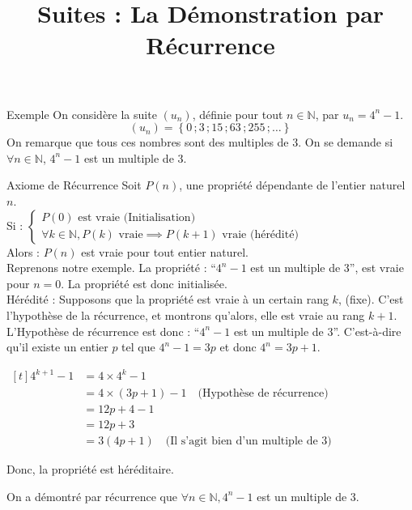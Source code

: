 \documentclass{cours}
\title{Suites : La Démonstration par Récurrence}
\begin{document}

    \begin{Gpartie}{Exemple}
        On considère la suite $\left(u_n\right)$, définie pour tout $n\in\mathbb{N}$, par $u_n=4^n-1$.
            \[\left(u_n\right)=\left\{0\,;3\,;15\,;63\,;255\,;\dots\right\}\]
        On remarque que tous ces nombres sont des multiples de 3. On se demande si $\forall n\in\mathbb{N}$, $4^n-1$ est un multiple de 3.
    \end{Gpartie}
    \begin{Gpartie}{Axiome de Récurrence}
        Soit $P(n)$, une propriété dépendante de l'entier naturel $n$. \\[2ex]
        Si :
        $\begin{cases}
            P(0)\text{ est vraie (Initialisation)} \\ \forall k\in\mathbb{N}, P(k)\text{ vraie}\implies P(k+1)\text{ vraie (hérédité)}
        \end{cases}$ \\[2ex]

        Alors : $P(n)$ est vraie pour tout entier naturel. \\[4ex]
        Reprenons notre exemple. La propriété : ``$4^n-1$ est un multiple de 3'', est vraie pour $n=0$. La propriété est donc initialisée.\\[2ex]
        Hérédité : Supposons que la propriété est vraie à un certain rang $k$, (fixe). C'est l'hypothèse de la récurrence, et montrons qu'alors, elle est vraie au rang $k+1$.\\[2ex]
        \pagebreak L'Hypothèse de récurrence est donc : ``$4^n-1$ est un multiple de 3''. C'est-à-dire qu'il existe un entier $p$ tel que $4^n-1=3p$ et donc $4^n=3p+1$. \\[4ex]

        {\begin{center}
        $\begin{aligned}[t]
            4^{k+1}-1&=4\times 4^k-1 &\\
            &= 4\times\left(3p+1\right)-1 \quad \text{(Hypothèse de récurrence)} &\\
            &=12p+4-1 &\\
            &=12p+3 &\\
            &=3\left(4p+1\right) \quad \text{(Il s'agit bien d'un multiple de 3)}
        \end{aligned}$
        \end{center}} \vspace{4ex}
        Donc, la propriété est héréditaire.

        On a démontré par récurrence que $\forall n\in\mathbb{N},4^n-1$ est un multiple de 3.
    \end{Gpartie}
\end{document}
